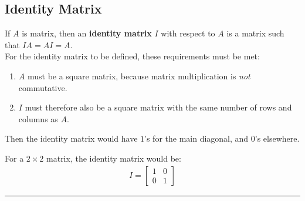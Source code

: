 \documentclass[../notes.tex]{subfiles}
\begin{document}
			\subsection{Identity Matrix}
				If $A$ is matrix, then an \textbf{identity matrix} $I$ with respect to $A$ is a matrix such that $IA = AI = A$.\\
				For the identity matrix to be defined, these requirements must be met:
				\begin{enumerate}
					\item $A$ must be a square matrix, because matrix multiplication is \textit{not} commutative.
					\item $I$ must therefore also be a square matrix with the same number of rows and columns as $A$.
				\end{enumerate}
				Then the identity matrix would have $1$'s for the main diagonal, and $0$'s elsewhere.
				\begin{example}
					For a $2 \times 2$ matrix, the identity matrix would be:
						\begin{align*}
							I = \begin{bmatrix}
								1 & 0\\
								0 & 1
							\end{bmatrix}
						\end{align*}
				\end{example}
	\noindent\rule{\textwidth}{0.4pt}
\end{document}
